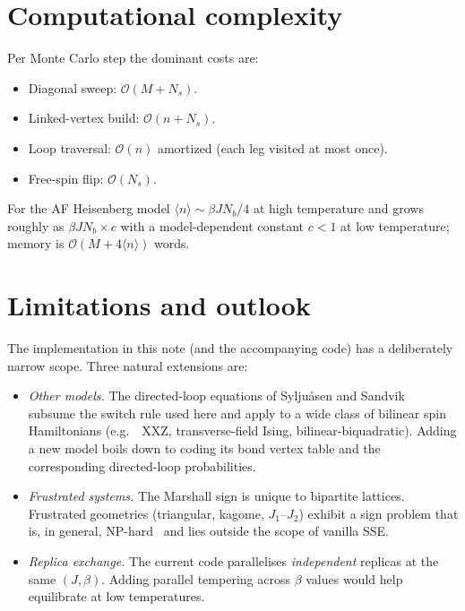 \documentclass[11pt,a4paper]{article}
\newcommand{\eg}{e.g.\ }
\newcommand{\Nb}{N_{b}}
\newcommand{\Ns}{N_{s}}
\theoremstyle{definition}
\theoremstyle{plain}
\begin{document}
\section{Computational complexity}\label{sec:complexity}
Per Monte Carlo step the dominant costs are:
\begin{itemize}
    \item Diagonal sweep:   $\mathcal O(M + \Ns)$.
    \item Linked-vertex build: $\mathcal O(n + \Ns)$.
    \item Loop traversal:   $\mathcal O(n)$ amortized (each leg
        visited at most once).
    \item Free-spin flip:   $\mathcal O(\Ns)$.
\end{itemize}
For the AF Heisenberg model $\langle n\rangle\sim \beta J\Nb/4$ at
high temperature and grows roughly as $\beta J\Nb \times c$ with a
model-dependent constant $c<1$ at low temperature; memory is
$\mathcal O(M+4\langle n\rangle)$ words.

\section{Limitations and outlook}\label{sec:outlook}
The implementation in this note (and the accompanying code) has a
deliberately narrow scope. Three natural extensions are:
\begin{itemize}
    \item \emph{Other models.} The directed-loop equations of
        Syljuåsen and Sandvik~\cite{syljuasen2002} subsume the
        switch rule used here and apply to a wide class of bilinear
        spin Hamiltonians (\eg\ XXZ, transverse-field Ising,
        bilinear-biquadratic). Adding a new model boils down to
        coding its bond vertex table and the corresponding
        directed-loop probabilities.
    \item \emph{Frustrated systems.} The Marshall sign is unique to
        bipartite lattices. Frustrated geometries
        (triangular, kagome, $J_1$--$J_2$) exhibit a sign problem
        that is, in general, NP-hard~\cite{troyer2005} and lies
        outside the scope of vanilla SSE.
    \item \emph{Replica exchange.} The current code parallelises
        \emph{independent} replicas at the same $(J,\beta)$.
        Adding parallel tempering across $\beta$ values would help
        equilibrate at low temperatures.
\end{itemize}
\end{document}
